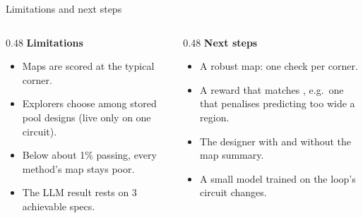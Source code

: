 \begin{frame}{Limitations and next steps}
  \begin{columns}[T]
    \begin{column}{0.48\textwidth}
      \textbf{Limitations}
      \small
      \begin{itemize}
        \item Maps are scored at the typical corner.
        \item Explorers choose among stored pool designs (live only on one circuit).
        \item Below about 1\% passing, every method's map stays poor.
        \item The LLM result rests on 3 achievable specs.
      \end{itemize}
    \end{column}
    \begin{column}{0.48\textwidth}
      \textbf{Next steps}
      \small
      \begin{itemize}
        \item A robust map: one check per corner.
        \item A reward that matches \passfail{}, e.g.\ one that penalises predicting too wide a region.
        \item The designer with and without the map summary.
        \item A small model trained on the loop's circuit changes.
      \end{itemize}
    \end{column}
  \end{columns}
\end{frame}
